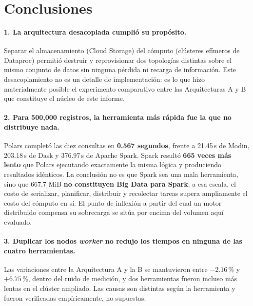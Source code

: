 \section{Conclusiones}

\paragraph{1. La arquitectura desacoplada cumplió su propósito.} Separar el almacenamiento (Cloud Storage) del cómputo (clústeres efímeros de Dataproc) permitió destruir y reprovisionar dos topologías distintas sobre el mismo conjunto de datos sin ninguna pérdida ni recarga de información. Este desacoplamiento no es un detalle de implementación: es lo que hizo materialmente posible el experimento comparativo entre las Arquitecturas A y B que constituye el núcleo de este informe.

\paragraph{2. Para 500,000 registros, la herramienta más rápida fue la que no distribuye nada.} Polars completó las diez consultas en \textbf{0.567 segundos}, frente a 21.45\,s de Modin, 203.18\,s de Dask y 376.97\,s de Apache Spark. Spark resultó \textbf{665 veces más lento} que Polars ejecutando exactamente la misma lógica y produciendo resultados idénticos. La conclusión no es que Spark sea una mala herramienta, sino que 667.7 MiB \textbf{no constituyen Big Data para Spark}: a esa escala, el costo de serializar, planificar, distribuir y recolectar tareas supera ampliamente el costo del cómputo en sí. El punto de inflexión a partir del cual un motor distribuido compensa su sobrecarga se sitúa por encima del volumen aquí evaluado.

\paragraph{3. Duplicar los nodos \textit{worker} no redujo los tiempos en ninguna de las cuatro herramientas.} Las variaciones entre la Arquitectura A y la B se mantuvieron entre $-2.16$\,\% y $+6.75$\,\%, dentro del ruido de medición, y dos herramientas fueron incluso más lentas en el clúster ampliado. Las causas son distintas según la herramienta y fueron verificadas empíricamente, no supuestas:

